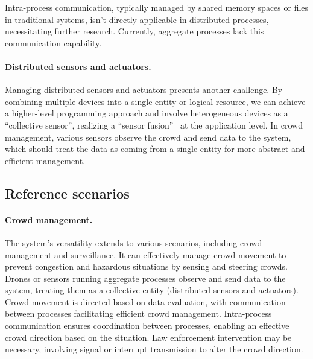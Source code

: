 \documentclass[12pt, a4paper]{article}
\begin{document}
Intra-process communication,
typically managed by shared memory spaces or files in traditional systems,
isn't directly applicable in distributed processes,
necessitating further research.
%
Currently, aggregate processes lack this communication capability.

\paragraph{Distributed sensors and actuators.}
\label{par:distributed-sensors-and-actuators}
Managing distributed sensors and actuators presents another challenge.
%
By combining multiple devices into a single entity or logical resource,
we can achieve a higher-level programming approach and involve heterogeneous devices as a ``collective sensor'',
realizing a ``sensor fusion''~\cite{sasiadek2002sensor} at the application level.
%
In crowd management,
various sensors observe the crowd and send data to the system,
which should treat the data as coming from a single entity for more abstract and efficient management.
%

\subsection{Reference scenarios}
\label{subsec:example-applications}

\sloppypar
\paragraph{Crowd management.}

The system's versatility extends to various scenarios,
including crowd management and surveillance.
%
It can effectively manage crowd movement to prevent congestion and hazardous situations by sensing and steering crowds.
%
Drones or sensors running aggregate processes observe and send data to the system,
treating them as a collective entity (distributed sensors and actuators).
%
Crowd movement is directed based on data evaluation,
with communication between processes facilitating efficient crowd management.
%
Intra-process communication ensures coordination between processes, enabling an effective crowd direction based on the situation.
%
Law enforcement intervention may be necessary,
involving signal or interrupt transmission to alter the crowd direction.
\end{document}

